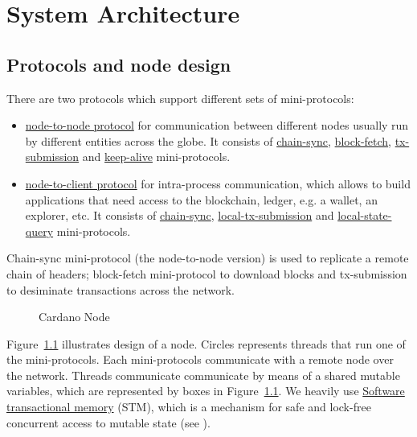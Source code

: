\chapter{System Architecture}

\section{Protocols and node design}
There are two protocols which support different sets of mini-protocols:
\begin{itemize}
  \item\hyperref[section:node-to-node-protocol]{node-to-node protocol}
    for communication between different nodes usually run by different
    entities across the globe.  It consists of
    \hyperref[chain-sync-protocol]{chain-sync},
    \hyperref[block-fetch-protocol]{block-fetch},
    \hyperref[tx-submission-protocol]{tx-submission} and
    \hyperref[keep-alive-protocol]{keep-alive} mini-protocols.
  \item\hyperref[section:node-to-client-protocol]{node-to-client
    protocol} for intra-process communication, which allows to build
    applications that need access to the blockchain, ledger, e.g. a wallet, an
    explorer, etc.  It consists of \hyperref[chain-sync-protocol]{chain-sync},
    \hyperref[local-tx-submission-protocol]{local-tx-submission} and
    \hyperref[local-state-query-protocol]{local-state-query} mini-protocols.
\end{itemize}

Chain-sync mini-protocol (the node-to-node version) is used to replicate
a remote chain of headers; block-fetch mini-protocol to download blocks and
tx-submission to desiminate transactions across the network.

\begin{figure}
  \begin{center}
  \end{center}
  \caption{Cardano Node}
  \label{node-diagram-concurrency}
\end{figure}

Figure~\ref{node-diagram-concurrency} illustrates design of a node.  Circles
represents threads that run one of the mini-protocols.  
Each mini-protocols communicate with a remote node over the network.
Threads communicate communicate by means of a shared mutable variables, which
are represented by boxes in Figure~\ref{node-diagram-concurrency}.
We heavily use
\href{https://en.wikipedia.org/wiki/Software_transactional_memory}{Software
transactional memory} (STM), which is a mechanism for safe and lock-free
concurrent access to mutable state (see \cite{stm:harris2006}).

